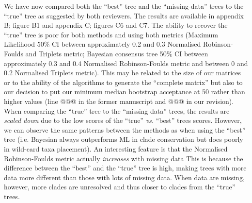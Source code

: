 \documentclass[12pt,letterpaper]{article}
\begin{document}
\begin{enumerate}
We have now compared both the ``best'' tree and the ``missing-data'' trees to the ``true'' tree as suggested by both reviewers.
The results are available in appendix B; figure B1 and appendix C; figures C6 and C7.
The ability to recover the ``true'' tree is poor for both methods and using both metrics (Maximum Likelihood 50\% CI between approximately 0.2 and 0.3 Normalised Robinson-Foulds and Triplets metric; Bayesian consensus tree 50\% CI between approximately 0.3 and 0.4 Normalised Robinson-Foulds metric and between 0 and 0.2 Normalised Triplets metric). %
This may be related to the size of our matrices or to the ability of the algorithms to generate the ``complete matrix'' but also to our decision to put our minimum median bootstrap acceptance at 50 rather than higher values (line @@@ in the former manuscript and @@@ in our revision).
When comparing the ``true'' tree to the ``missing data'' trees, the results are \textit{scaled down} due to the low scores of the ``true'' \textit{vs.} ``best'' trees scores.
However, we can observe the same patterns between the methods as when using the ``best'' tree (i.e. Bayesian always outperforms ML in clade conservation but does poorly in wild-card taxa placement).
An interesting feature is that the Normalised Robinson-Foulds metric actually \textit{increases} with missing data %
This is because the difference between the ``best'' and the ``true'' tree is high, making trees with more data more different than those with lots of missing data.
When data are missing, however, more clades are unresolved and thus closer to clades from the ``true'' trees.


\end{enumerate}
\end{document}
